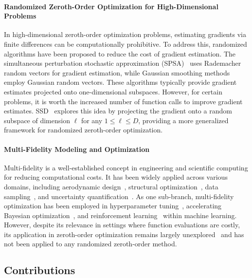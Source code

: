 \documentclass[10pt]{article} %
\numberwithin{equation}{section}
\theoremstyle{plain}
\theoremstyle{definition}
\newcommand{\<}{\langle}
\renewcommand{\>}{\rangle}
\renewcommand{\(}{\left(}
\renewcommand{\)}{\right)}
\renewcommand{\[}{\left[}
\renewcommand{\]}{\right]}
\begin{document}
\paragraph{Randomized Zeroth-Order Optimization for High-Dimensional Problems}
In high-dimensional zeroth-order optimization problems, estimating gradients via finite differences can be computationally prohibitive. To address this, randomized algorithms have been proposed to reduce the cost of gradient estimation. The simultaneous perturbation stochastic approximation (SPSA)~\citep{spall1992multivariate,spall1998implementation} uses Rademacher random vectors for gradient estimation, while Gaussian smoothing methods~\citep{nesterov2017random} employ Gaussian random vectors. These algorithms typically provide gradient estimates projected onto one-dimensional subspaces. However, for certain problems, it is worth the increased number of function calls to improve gradient estimates. SSD~\citep{kozak2021stochastic} explores this idea by projecting the gradient onto a random subspace of dimension $\ell$ for any $1\le \ell \le D$, providing a more generalized framework for randomized zeroth-order optimization.

\paragraph{Multi-Fidelity Modeling and Optimization}
Multi-fidelity is a well-established concept in engineering and scientific computing for reducing computational costs. It has been widely applied across various domains, including aerodynamic design~\citep{zhang2021multi}, structural optimization~\citep{ng2014multifidelity, de2020bi}, data sampling~\citep{cheng2024subsampling}, and uncertainty quantification~\citep{peherstorfer2018survey, cheng2024bi, de2022neural, de2023bi, cheng2025langevin, cheng2025multi}. As one sub-branch, multi-fidelity optimization has been employed in hyperparameter tuning~\citep{wu2020practical}, accelerating Bayesian optimization~\citep{kandasamy2016gaussian, takeno2020multi}, and reinforcement learning~\citep{cutler2014reinforcement} within machine learning. 
However, despite its relevance in settings where function evaluations are costly, its application in zeroth-order optimization remains largely unexplored~\citep{demontbrun2024certified} and has not been applied to any randomized zeroth-order method.

\subsection{Contributions}
\label{ssec:contribution}
\end{document}

